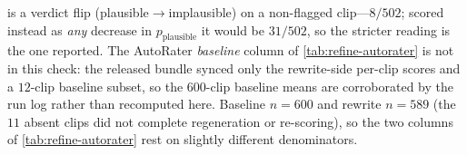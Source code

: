 \begin{table}[t]
{is a verdict flip (plausible$\to$implausible) on a non-flagged clip---$8/502$; scored
instead as \emph{any} decrease in $p_{\text{plausible}}$ it would be $31/502$, so the
stricter reading is the one reported. The AutoRater \emph{baseline} column of
\cref{tab:refine-autorater} is not in this check: the released bundle synced only the
rewrite-side per-clip scores and a $12$-clip baseline subset, so the $600$-clip baseline
means are corroborated by the run log rather than recomputed here. Baseline $n=600$ and
rewrite $n=589$ (the $11$ absent clips did not complete regeneration or re-scoring), so
the two columns of \cref{tab:refine-autorater} rest on slightly different denominators.}
\label{tab:refine-verify}
\end{table}
